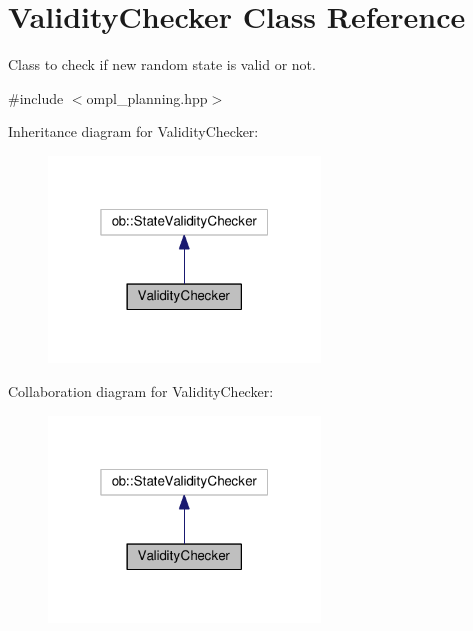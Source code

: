 \hypertarget{classValidityChecker}{}\section{Validity\+Checker Class Reference}
\label{classValidityChecker}


Class to check if new random state is valid or not.  




{\ttfamily \#include $<$ompl\+\_\+planning.\+hpp$>$}



Inheritance diagram for Validity\+Checker\+:\nopagebreak
\begin{figure}[H]
\begin{center}
\leavevmode
\includegraphics[width=205pt]{classValidityChecker__inherit__graph}
\end{center}
\end{figure}


Collaboration diagram for Validity\+Checker\+:\nopagebreak
\begin{figure}[H]
\begin{center}
\leavevmode
\includegraphics[width=205pt]{classValidityChecker__coll__graph}
\end{center}
\end{figure}
